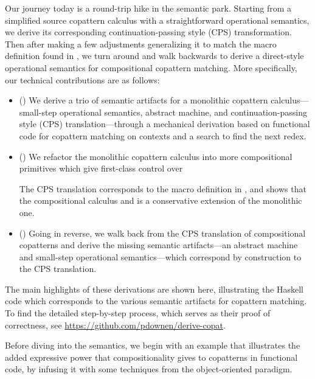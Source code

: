 \documentclass[sigplan,screen]{acmart}
\begin{document}
Our journey today is a round-trip hike in the semantic park.  Starting from a
simplified source copattern calculus with a straightforward operational
semantics, we derive its corresponding continuation-passing style (CPS)
transformation.  Then after making a few adjustments generalizing it to match
the macro definition found in \cite{CoScheme}, we turn around and walk backwards
to derive a direct-style operational semantics for compositional copattern
matching.  More specifically, our technical contributions are as follows:
\begin{itemize}
\item () We derive a trio of semantic artifacts for a
  monolithic copattern calculus---small-step operational semantics, abstract
  machine, and continuation-passing style (CPS) translation---through a
  mechanical derivation based on functional code for copattern matching on
  contexts and a search to find the next redex.
\item () We refactor the monolithic copattern calculus into
  more compositional primitives which give first-class control over
  The CPS translation corresponds to the macro definition in \cite{CoScheme},
  and shows that the compositional calculus and is a conservative extension of
  the monolithic one.
\item () Going in reverse, we walk back from the CPS
  translation of compositional copatterns and derive the missing semantic
  artifacts---an abstract machine and small-step operational semantics---which
  correspond by construction to the CPS translation.
\end{itemize}
The main highlights of these derivations are shown here, illustrating the
Haskell code which corresponds to the various semantic artifacts for copattern
matching.  To find the detailed step-by-step process, which serves as their
proof of correctness, see \url{https://github.com/pdownen/derive-copat}.

Before diving into the semantics, we begin with an example that illustrates the
added expressive power that compositionality gives to copatterns in functional
code, by infusing it with some techniques from the object-oriented paradigm.
\end{document}
